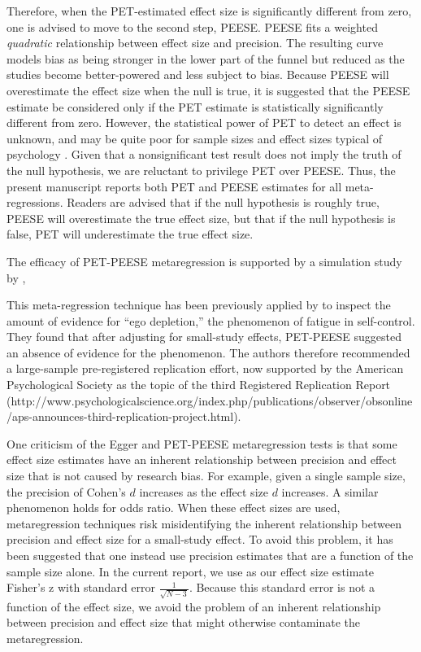 \documentclass[man]{apa6}
\begin{document}
Therefore, when the PET-estimated effect size is significantly different from zero, one is advised to move to the second step, PEESE. PEESE fits a weighted {\em quadratic} relationship between effect size and precision. The resulting curve models bias as being stronger in the lower part of the funnel but reduced as the studies become better-powered and less subject to bias. Because PEESE will overestimate the effect size when the null is true, it is suggested that the PEESE estimate be considered only if the PET estimate is statistically significantly different from zero. However, the statistical power of PET to detect an effect is unknown, and may be quite poor for sample sizes and effect sizes typical of psychology \citet{blogposts}. Given that a nonsignificant test result does not imply the truth of the null hypothesis, we are reluctant to privilege PET over PEESE. Thus, the present manuscript reports both PET and PEESE estimates for all meta-regressions. Readers are advised that if the null hypothesis is roughly true, PEESE will overestimate the true effect size, but that if the null hypothesis is false, PET will underestimate the true effect size.

The efficacy of PET-PEESE metaregression is supported by a simulation study by \citet{Moreno:etal:2006}, 

This meta-regression technique has been previously applied by \citet{Carter:McCullough:2014} to inspect the amount of evidence for ``ego depletion,'' the phenomenon of fatigue in self-control. They found that after adjusting for small-study effects, PET-PEESE suggested an absence of evidence for the phenomenon. The authors therefore recommended a large-sample pre-registered replication effort, now supported by the American Psychological Society as the topic of the third Registered Replication Report (http://www.psychologicalscience.org/index.php/publications/observer/obsonline/aps-announces-third-replication-project.html).

One criticism of the Egger and PET-PEESE metaregression tests is that some effect size estimates have an inherent relationship between precision and effect size that is not caused by research bias. For example, given a single sample size, the precision of Cohen's $d$ increases as the effect size $d$ increases. A similar phenomenon holds for odds ratio. When these effect sizes are used, metaregression techniques risk misidentifying the inherent relationship between precision and effect size for a small-study effect. To avoid this problem, it has been suggested that one instead use precision estimates that are a function of the sample size alone. In the current report, we use as our effect size estimate Fisher's z with standard error $\frac{1}{\sqrt{N-3}}$. Because this standard error is not a function of the effect size, we avoid the problem of an inherent relationship between precision and effect size that might otherwise contaminate the metaregression.
\end{document}
